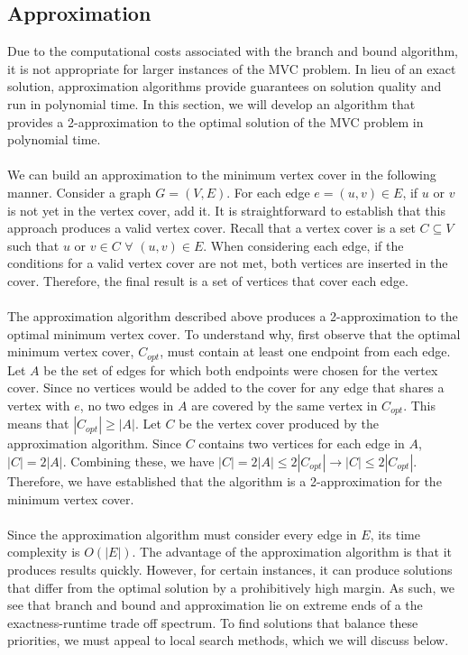 \documentclass{sig-alternate-05-2015}
\begin{document}
\subsection{Approximation}
Due to the computational costs associated with the branch and bound algorithm, it is not appropriate for larger instances of the MVC problem. In lieu of an exact solution, approximation algorithms provide guarantees on solution quality and run in polynomial time. In this section, we will develop an algorithm that provides a 2-approximation to the optimal solution of the MVC problem in polynomial time.
\\
\\
We can build an approximation to the minimum vertex cover in the following manner. Consider a graph $G=(V,E)$. For each edge $e=(u,v) \in E$, if $u$ or $v$ is not yet in the vertex cover, add it. It is straightforward to establish that this approach produces a valid vertex cover. Recall that a vertex cover is a set $C \subseteq V$ such that $u$ or $v \in C$ $\forall$ $(u,v) \in E$. When considering each edge, if the conditions for a valid vertex cover are not met, both vertices are inserted in the cover. Therefore, the final result is a set of vertices that cover each edge.
\\
\\
The approximation algorithm described above produces a 2-approximation to the optimal minimum vertex cover. To understand why, first observe that the optimal minimum vertex cover, $C_{opt}$, must contain at least one endpoint from each edge. Let $A$ be the set of edges for which both endpoints were chosen for the vertex cover. Since no vertices would be added to the cover for any edge that shares a vertex with $e$, no two edges in $A$ are covered by the same vertex in $C_{opt}$. This means that $|C_{opt}| \geq |A|$.  Let $C$ be the vertex cover produced by the approximation algorithm. Since $C$ contains two vertices for each edge in $A$, $|C|=2|A|$. Combining these, we have $|C|=2|A|\leq 2|C_{opt}| \rightarrow |C| \leq 2|C_{opt}|$. Therefore, we have established that the algorithm is a 2-approximation for the minimum vertex cover.
\\
\\
Since the approximation algorithm must consider every edge in $E$, its time complexity is $O(|E|)$. The advantage of the approximation algorithm is that it produces results quickly. However, for certain instances, it can produce solutions that differ from the optimal solution by a prohibitively high margin. As such, we see that branch and bound and approximation lie on extreme ends of a the exactness-runtime trade off spectrum. To find solutions that balance these priorities, we must appeal to local search methods, which we will discuss below.
\end{document}

